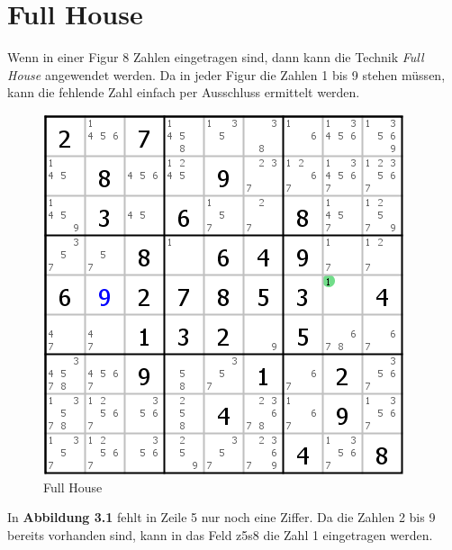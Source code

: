 \newpage
\section{Full House}
\label{Full_House}
Wenn in einer Figur 8 Zahlen eingetragen sind, dann kann die Technik \textit{Full House} angewendet werden. Da in jeder Figur die Zahlen 1 bis 9 stehen müssen, kann die fehlende Zahl einfach per Ausschluss ermittelt werden.\\

\begin{figure}[h]
\begin{center}
\includegraphics{./img/full_house.png}
\caption{Full House}
\end{center}
\end{figure}

In \textbf{Abbildung 3.1} fehlt in Zeile 5 nur noch eine Ziffer. Da die Zahlen 2 bis 9 bereits vorhanden sind, kann in das Feld z5s8 die Zahl 1 eingetragen werden.